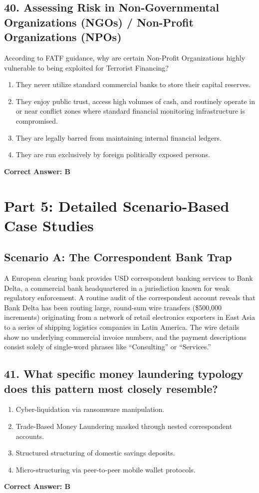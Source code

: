 \documentclass[11pt,a4paper]{article}
\begin{document}
	\subsection{40. Assessing Risk in Non-Governmental Organizations (NGOs) / Non-Profit Organizations (NPOs)}
	According to FATF guidance, why are certain Non-Profit Organizations highly vulnerable to being exploited for Terrorist Financing?
	\begin{enumerate}[label=\Alph*.]
		\item They never utilize standard commercial banks to store their capital reserves.
		\item They enjoy public trust, access high volumes of cash, and routinely operate in or near conflict zones where standard financial monitoring infrastructure is compromised.
		\item They are legally barred from maintaining internal financial ledgers.
		\item They are run exclusively by foreign politically exposed persons.
	\end{enumerate}
	\textbf{Correct Answer: B}
	
	\newpage
	\section{Part 5: Detailed Scenario-Based Case Studies}
	
	\subsection*{Scenario A: The Correspondent Bank Trap}
	A European clearing bank provides USD correspondent banking services to Bank Delta, a commercial bank headquartered in a jurisdiction known for weak regulatory enforcement. A routine audit of the correspondent account reveals that Bank Delta has been routing large, round-sum wire transfers (\$500,000 increments) originating from a network of retail electronics exporters in East Asia to a series of shipping logistics companies in Latin America. The wire details show no underlying commercial invoice numbers, and the payment descriptions consist solely of single-word phrases like ``Consulting'' or ``Services.''
	
	\subsection{41. What specific money laundering typology does this pattern most closely resemble?}
	\begin{enumerate}[label=\Alph*.]
		\item Cyber-liquidation via ransomware manipulation.
		\item Trade-Based Money Laundering masked through nested correspondent accounts.
		\item Structured structuring of domestic savings deposits.
		\item Micro-structuring via peer-to-peer mobile wallet protocols.
	\end{enumerate}
	\textbf{Correct Answer: B}
	
\end{document}

